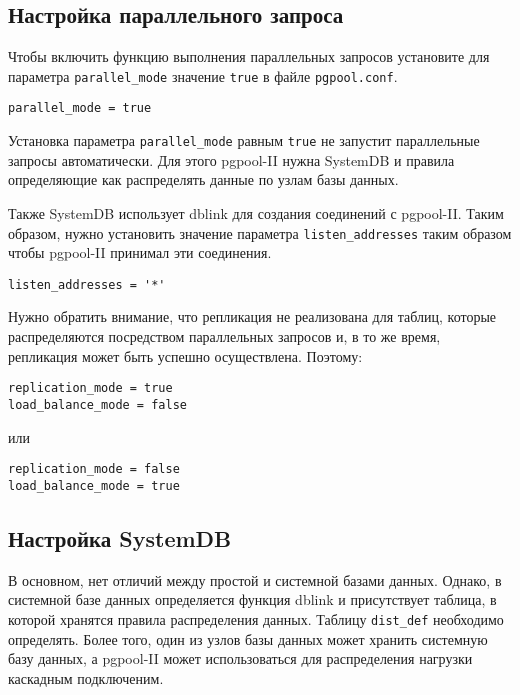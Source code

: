 \subsection{Настройка параллельного запроса}

Чтобы включить функцию выполнения параллельных запросов установите для параметра \lstinline!parallel_mode! значение \lstinline!true! в файле \lstinline!pgpool.conf!.

\begin{lstlisting}[label=lst:pgpool22,caption=Настройка параллельного запроса]
parallel_mode = true
\end{lstlisting}

Установка параметра \lstinline!parallel_mode! равным \lstinline!true! не запустит параллельные запросы автоматически. Для этого pgpool-II нужна SystemDB и правила определяющие как распределять данные по узлам базы данных.

Также SystemDB использует dblink для создания соединений с pgpool-II. Таким образом, нужно установить значение параметра \lstinline!listen_addresses! таким образом чтобы pgpool-II принимал эти соединения.

\begin{lstlisting}[label=lst:pgpool23,caption=Настройка параллельного запроса]
listen_addresses = '*'
\end{lstlisting}

Нужно обратить внимание, что репликация не реализована для таблиц, которые распределяются посредством параллельных запросов и, в то же время, репликация может быть успешно осуществлена. Поэтому:

\begin{lstlisting}[label=lst:pgpool24,caption=Настройка параллельного запроса]
replication_mode = true
load_balance_mode = false
\end{lstlisting}

или

\begin{lstlisting}[label=lst:pgpool25,caption=Настройка параллельного запроса]
replication_mode = false
load_balance_mode = true
\end{lstlisting}

\subsection{Настройка SystemDB}

В основном, нет отличий между простой и системной базами данных. Однако, в системной базе данных определяется функция dblink и присутствует таблица, в которой хранятся правила распределения данных. Таблицу \lstinline!dist_def! необходимо определять. Более того, один из узлов базы данных может хранить системную базу данных, а pgpool-II может использоваться для распределения нагрузки каскадным подключеним.

